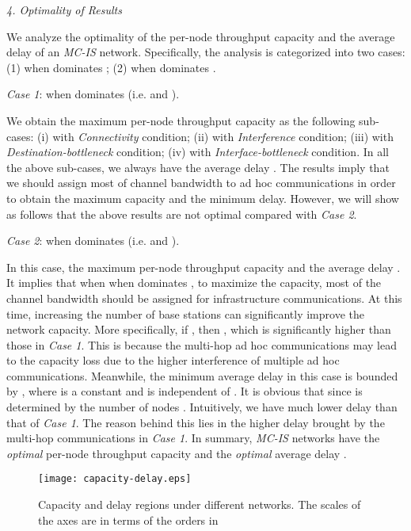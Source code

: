 \documentclass[10pt,journal]{IEEEtran}
\begin{document}
\emph{4. Optimality of Results}

We analyze the optimality of the per-node throughput capacity  and the average delay  of an \textit{MC-IS} network. Specifically, the analysis is categorized into two cases: (1) when  dominates ; (2) when  dominates .

\textit{Case 1}: when  dominates  (i.e.  and ).

We obtain the maximum per-node throughput capacity as the following sub-cases: (i)  with \emph{Connectivity} condition; (ii)  with \emph{Interference} condition; (iii)  with \emph{Destination-bottleneck} condition; (iv)  with \emph{Interface-bottleneck} condition. In all the above sub-cases, we always have the average delay . The results imply that we should assign most of channel bandwidth to ad hoc communications in order to obtain the maximum capacity and the minimum delay. However, we will show as follows that the above results are not optimal compared with \textit{Case 2}.

\textit{Case 2}: when  dominates  (i.e.  and ).

In this case, the maximum per-node throughput capacity  and the average delay . It implies that when when  dominates , to maximize the capacity, most of the channel bandwidth should be assigned for infrastructure communications. At this time, increasing the number of base stations can significantly improve the network capacity. More specifically, if , then , which is significantly higher than those in \textit{Case 1}. This is because the multi-hop ad hoc communications may lead to the capacity loss due to the higher interference of multiple ad hoc communications. Meanwhile, the minimum average delay  in this case is bounded by , where  is a constant and  is independent of . It is obvious that  since  is determined by the number of nodes . Intuitively, we have much lower delay than that of \textit{Case 1}. The reason behind this lies in the higher delay brought by the multi-hop communications in \textit{Case 1}. In summary, \textit{MC-IS} networks have the \emph{optimal} per-node throughput capacity  and the \emph{optimal} average delay . 

\begin{figure}[t]
\centering
\texttt{[image: capacity-delay.eps]}
\caption{Capacity and delay regions under different networks. The scales of the axes are in terms of the orders in }
\label{fig:cap-delay}
\end{figure}
\end{document}
